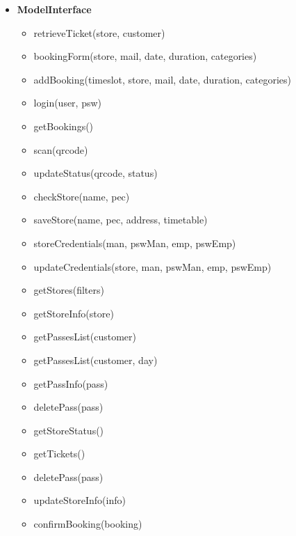 \begin{itemize}
	\item \textbf{ModelInterface}
	\begin{itemize}
		\item retrieveTicket(store, customer)
		\item bookingForm(store, mail, date, duration, categories)
		\item addBooking(timeslot, store, mail, date, duration, categories)
		\item login(user, psw)
		\item getBookings()
		\item scan(qrcode)
		\item updateStatus(qrcode, status)
		\item checkStore(name, pec)
		\item saveStore(name, pec, address, timetable)
		\item storeCredentials(man, pswMan, emp, pswEmp)
		\item updateCredentials(store, man, pswMan, emp, pswEmp)
		\item getStores(filters)
		\item getStoreInfo(store)
		\item getPassesList(customer)
		\item getPassesList(customer, day)
		\item getPassInfo(pass)
		\item deletePass(pass)
		\item getStoreStatus()
		\item getTickets()
		\item deletePass(pass)
		\item updateStoreInfo(info)
		\item confirmBooking(booking)
	\end{itemize}

	\clearpage


\end{itemize}
